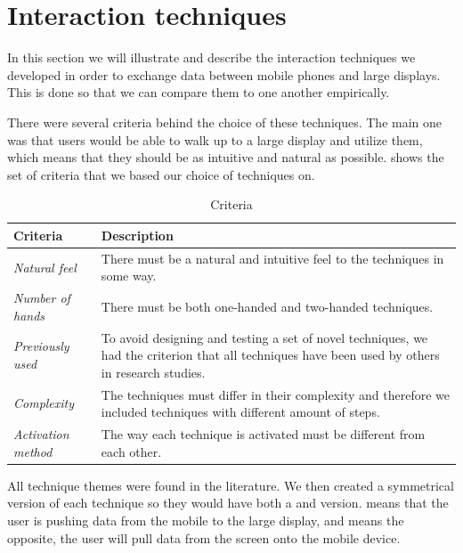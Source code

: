 \section{Interaction techniques} \label{sec:techniques}
In this section we will illustrate and describe the interaction techniques we developed in order to exchange data between mobile phones and large displays.
This is done so that we can compare them to one another empirically.

There were several criteria behind the choice of these techniques. 
The main one was that users would be able to walk up to a large display and utilize them, which means that they should be as intuitive and natural as possible. 
 shows the set of criteria that we based our choice of techniques on.

\begin{table}[H]
	\centering
	\begin{tabular}{p{} p{}}
		\hline
		\textbf{Criteria} & \textbf{Description} \\ \hline
		\textit{Natural feel} & There must be a natural and intuitive feel to the techniques in some way. \\ \hline
		\textit{Number of hands} & There must be both one-handed and two-handed techniques. \\ \hline
		\textit{Previously used} & To avoid designing and testing a set of novel techniques, we had the criterion that all techniques have been used by others in research studies. \\ \hline
		\textit{Complexity} & The techniques must differ in their complexity and therefore we included techniques with different amount of steps. \\ \hline
		\textit{Activation method} & The way each technique is activated must be different from each other. \\ \hline
	\end{tabular}
	\caption{Criteria}
	\label{tab:techniqueCriteria}
\end{table}


All technique themes were found in the literature.
We then created a symmetrical version of each technique so they would have both a \push and \pull version.
\push means that the user is pushing data from the mobile to the large display, and \pull means the opposite, the user will pull data from the screen onto the mobile device. 

